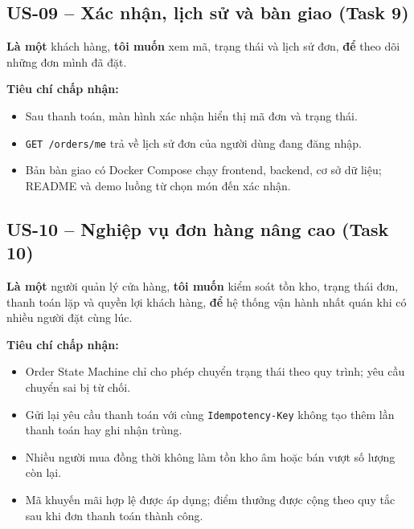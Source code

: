 \subsection*{US-09 -- Xác nhận, lịch sử và bàn giao (Task 9)}
\textbf{Là một} khách hàng, \textbf{tôi muốn} xem mã, trạng thái và lịch sử đơn, \textbf{để} theo dõi những đơn mình đã đặt.

\textbf{Tiêu chí chấp nhận:}
\begin{itemize}
  \item Sau thanh toán, màn hình xác nhận hiển thị mã đơn và trạng thái.
  \item \texttt{GET /orders/me} trả về lịch sử đơn của người dùng đang đăng nhập.
  \item Bản bàn giao có Docker Compose chạy frontend, backend, cơ sở dữ liệu; README và demo luồng từ chọn món đến xác nhận.
\end{itemize}

\subsection*{US-10 -- Nghiệp vụ đơn hàng nâng cao (Task 10)}
\textbf{Là một} người quản lý cửa hàng, \textbf{tôi muốn} kiểm soát tồn kho, trạng thái đơn, thanh toán lặp và quyền lợi khách hàng, \textbf{để} hệ thống vận hành nhất quán khi có nhiều người đặt cùng lúc.

\textbf{Tiêu chí chấp nhận:}
\begin{itemize}
  \item Order State Machine chỉ cho phép chuyển trạng thái theo quy trình; yêu cầu chuyển sai bị từ chối.
  \item Gửi lại yêu cầu thanh toán với cùng \texttt{Idempotency-Key} không tạo thêm lần thanh toán hay ghi nhận trùng.
  \item Nhiều người mua đồng thời không làm tồn kho âm hoặc bán vượt số lượng còn lại.
  \item Mã khuyến mãi hợp lệ được áp dụng; điểm thưởng được cộng theo quy tắc sau khi đơn thanh toán thành công.
\end{itemize}
